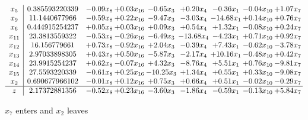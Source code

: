 \documentclass[9pt]{article}
\begin{document}
 \[\begin{array}{c| c c@{\hskip 2pt} c@{\hskip 2pt} c@{\hskip 2pt} c@{\hskip 2pt} c@{\hskip 2pt} c@{\hskip 2pt} c@{\hskip 2pt} }
 x_{5}   &  0.385593220339 & -0.09 x_{8} & +  0.03 x_{16} & -0.65 x_{3} & +  0.20 x_{4} & -0.36 x_{1} & -0.04 x_{10} & +  1.07 x_{7}\\
 x_{9}   &  11.1440677966 & -0.59 x_{8} & +  0.22 x_{16} & -9.47 x_{3} & -3.03 x_{4} & -14.68 x_{1} & +  0.14 x_{10} & +  0.76 x_{7}\\
 x_{6}   &  0.444915254237 & +  0.05 x_{8} & +  0.03 x_{16} & +  0.09 x_{3} & +  0.54 x_{4} & +  1.32 x_{1} & -0.08 x_{10} & +  0.24 x_{7}\\
 x_{11}   &  23.3813559322 & -0.53 x_{8} & -0.26 x_{16} & -6.49 x_{3} & -13.68 x_{4} & -4.23 x_{1} & +  0.71 x_{10} & +  0.92 x_{7}\\
 x_{12}   &  16.156779661 & +  0.73 x_{8} & -0.92 x_{16} & +  2.04 x_{3} & -0.39 x_{4} & +  7.43 x_{1} & -0.62 x_{10} & -3.78 x_{7}\\
 x_{13}   &  2.97033898305 & +  0.43 x_{8} & +  0.50 x_{16} & -5.87 x_{3} & -2.17 x_{4} & + 10.16 x_{1} & -0.48 x_{10} & +  0.42 x_{7}\\
 x_{14}   &  23.9915254237 & +  0.62 x_{8} & -0.07 x_{16} & +  4.32 x_{3} & -8.76 x_{4} & +  5.51 x_{1} & +  0.76 x_{10} & -9.81 x_{7}\\
 x_{15}   &  27.5593220339 & -0.61 x_{8} & +  0.25 x_{16} & -10.25 x_{3} & +  1.34 x_{4} & +  0.55 x_{1} & +  0.33 x_{10} & -9.08 x_{7}\\
 x_{2}   &  0.690677966102 & -0.01 x_{8} & +  0.12 x_{16} & +  0.75 x_{3} & +  0.66 x_{4} & +  0.51 x_{1} & -0.02 x_{10} & -0.29 x_{7}\\
\hline
z    &  2.17372881356 & -0.52 x_{8} & +  0.23 x_{16} & -3.60 x_{3} & -1.86 x_{4} & -0.59 x_{1} & -0.13 x_{10} & +  5.84 x_{7}\\
\end{array}\]


 $ x_{7} $ enters and $ x_{2} $ leaves 
\end{document}
